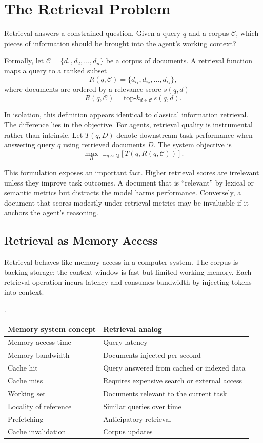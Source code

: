 \section{The Retrieval Problem}

Retrieval answers a constrained question. Given a query $q$ and a corpus $\mathcal{C}$, which pieces of information should be brought into the agent’s working context?

Formally, let $\mathcal{C} = \{d_1, d_2, \ldots, d_n\}$ be a corpus of documents. A retrieval function maps a query to a ranked subset
\[
R(q, \mathcal{C}) = \{d_{i_1}, d_{i_2}, \ldots, d_{i_k}\},
\]
where documents are ordered by a relevance score $s(q,d)$
\[
R(q, \mathcal{C}) = \text{top-}k_{d \in \mathcal{C}} \, s(q,d).
\]

In isolation, this definition appears identical to classical information retrieval. The difference lies in the objective. For agents, retrieval quality is instrumental rather than intrinsic. Let $T(q, D)$ denote downstream task performance when answering query $q$ using retrieved documents $D$. The system objective is
\[
\max_{R} \; \mathbb{E}_{q \sim Q}\left[ T(q, R(q, \mathcal{C})) \right].
\]

This formulation exposes an important fact. Higher retrieval scores are irrelevant unless they improve task outcomes. A document that is “relevant” by lexical or semantic metrics but distracts the model harms performance. Conversely, a document that scores modestly under retrieval metrics may be invaluable if it anchors the agent’s reasoning.

\subsection{Retrieval as Memory Access}

Retrieval behaves like memory access in a computer system. The corpus is backing storage; the context window is fast but limited working memory. Each retrieval operation incurs latency and consumes bandwidth by injecting tokens into context.

\begin{center}.
\begin{tabular}{ll}
\toprule
Memory system concept & Retrieval analog \\
\midrule
Memory access time & Query latency \\
Memory bandwidth & Documents injected per second \\
Cache hit & Query answered from cached or indexed data \\
Cache miss & Requires expensive search or external access \\
Working set & Documents relevant to the current task \\
Locality of reference & Similar queries over time \\
Prefetching & Anticipatory retrieval \\
Cache invalidation & Corpus updates \\
\bottomrule
\end{tabular}
\end{center}

